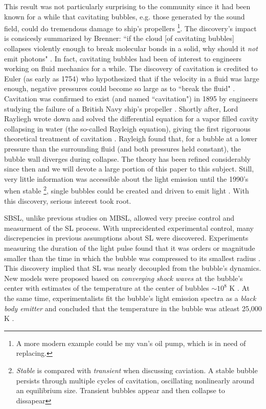 \documentclass[rmp,aps,nofootinbib,superscriptaddress,floatfix]{revtex4-2}
\begin{document}
This result was not particularly surprising to the community since it had been known for a while that cavitating bubbles, e.g. those generated by the sound field, could do tremendous damage to ship's propellers \footnote{A more modern example could be my van's oil pump, which is in need of replacing.}. The discovery's impact is consicesly summarized by Brenner: ``if the cloud [of cavitating bubbles] collapses violently enough to break molecular bonds in a solid, why should it \emph{not} emit photons" \cite{brenner2002single}. In fact, cavitating bubbles had been of interest to engineers working on fluid mechanics for a while. The discovery of cavitation is credited to Euler (as early as 1754) who hypothesized that if the velocity in a fluid was large enough, negative pressures could become so large as to ``break the fluid" \cite{li2015introduction,gaitan1992sonoluminescence}. Cavitation was confirmed to exist (and named ``cavitation") in 1895 by engineers studying the failure of a British Navy ship's propeller \cite{li2015introduction}. Shortly after, Lord Rayliegh wrote down and solved the differential equation for a vapor filled cavity collapsing in water (the so-called Rayleigh equation), giving the first rigoruous theoretical treatment of cavitation \cite{rayleigh1917pressure,plesset1977bubble}. Rayleigh found that, for a bubble at a lower pressure than the surrounding fluid (and both pressures held constant), the bubble wall diverges during collapse. The theory has been refined considerably since then \cite{prosperetti1999old,plesset1977bubble,plesset1977bubble,brenner2002single,lofstedt1995sonoluminescing,barber1992resolving} and we will devote a large portion of this paper to this subject. Still, very little information was accessible about the light emission until the 1990's when stable \footnote{\emph{Stable} is compared with \emph{transient} when discussing caviation. A stable bubble persists through multiple cycles of cavitation, oscillating nonlinearly around an equilibrium size. Transient bubbles appear and then collapse to dissapear}, single bubbles could be created and driven to emit light \cite{gaitan1990experimental,gaitan1992sonoluminescence,crum1994sonoluminescence}. With this discovery, serious interest took root. 

SBSL, unlike previous studies on MBSL, allowed very precise control and measurment of the SL process. With unprecidented experimental control, many discrepencies in previous assumptions about SL were discovered. Experiments measuring the duration of the light pulse found that it was orders or magnitude smaller than the time in which the bubble was compressed to its smallest radius \cite{barber1992resolving,barber1991observation}. This discovery implied that SL was nearly decoupled from the bubble's dynamics. New models were proposed based on \emph{converging shock waves} at the bubble's center with estimates of the temperature at the center of bubbles $\sim10^8$ K \cite{wu1993shock,greenspan1993sonoluminescence}. At the same time, experimentalists fit the bubble's light emission spectra as a \emph{black body emitter} and concluded that the temperature in the bubble was atleast 25,000 K \cite{hiller1992spectrum}. 
\end{document}
